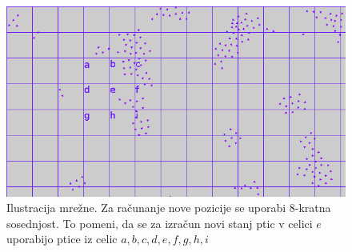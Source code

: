 \documentclass[a4paper, 12pt]{book}
\begin{document}
\begin{figure}[t]
\includegraphics[width=\textwidth]{flocking_simulation_grid}
\caption{Ilustracija mrežne. Za računanje nove pozicije se uporabi 8-kratna sosednjost. To pomeni, da se za izračun novi stanj ptic v celici $e$ uporabijo ptice iz celic $a, b, c, d, e, f, g, h, i$}
\label{img:flocking_simulation_grid}
\centering
\end{figure}

\begin{table}[]
\centering
{}
\caption{Primerjava števila okvirjev na sekundo (ang. Frames per second) v odvisnosti od velikosti jate za serijski algoritem in serijski algoritem z mrežo}
\label{tabela_meritev_serijskih_alg}
\end{table}
\end{document}
